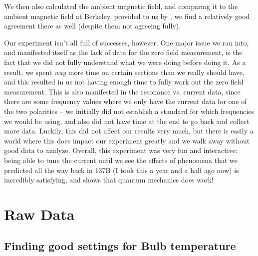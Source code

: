 \documentclass[10pt]{article}
\begin{document}
	We then also calculated the ambient magnetic field, and comparing it to the
	ambient magnetic field at Berkeley, provided to us by
	\cite{WorldMagneticModel2020}, we find a
	relatively good agreement there as well (despite them not agreeing fully).  

	Our experiment isn't all full of successes, however. One major issue we ran into,
	and manifested itself as the lack of data for the zero field measurement, is the
	fact that we did not fully understand what we were doing before doing it. As a
	result, we spent \textit{way} more time on certain sections than we really should
	have, and this resulted in us not having enough time to fully work out the zero
	field measurement. This is also manifested in the resonance vs. current data,
	since there are some frequency values where we only have the current data for one 
	of the two polarities -- we initially did not establish a standard for which
	frequencies we would be using, and also did not have time at the end to go back
	and collect more data. Luckily, this did not affect our results very much, but
	there is easily a world where this does impact our experiment greatly and we walk
	away without good data to analyze. 
	Overall, this experiment was very fun and interactive: being able to tune the
	current until we see the effects of phenomena that we predicted
	all the way back in 137B (I took this a year and a half ago now) is
	incredibly satisfying, and shows that quantum mechanics does work!   


	\nocite{*}
	\printbibliography

	\pagebreak
	\appendix
	\section{Raw Data}

	\subsection{Finding good settings for Bulb temperature} 
\end{document}
